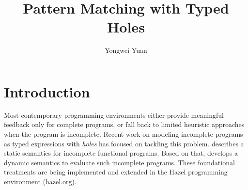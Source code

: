 \documentclass[acmsmall,screen,review,nonacm]{acmart}
\theoremstyle{slplain}
\numberwithin{thm}{section}
\begin{document}
  
\title{Pattern Matching with Typed Holes}

\author{Yongwei Yuan}


\maketitle

\section{Introduction}
\label{sec:intro}
Most contemporary programming environments either provide meaningful feedback only for complete programs, or fall back to limited heuristic approaches when the program is incomplete.
Recent work on modeling incomplete programs as typed expressions with \emph{holes} has focused on tackling this problem. \citet{DBLP:conf/popl/OmarVHAH17} describes a static semantics for incomplete functional programs. Based on that, \citet{DBLP:journals/pacmpl/OmarVCH19} develops a dynamic semantics to evaluate such incomplete programs.
These foundational treatments are being implemented and extended in the Hazel programming environment (hazel.org).
\end{document}
